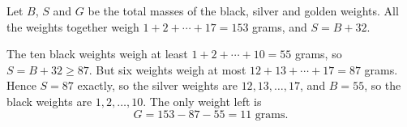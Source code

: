Let $B$, $S$ and $G$ be the total masses of the black, silver and golden weights. All the weights together weigh $1+2+\cdots+17=153$ grams, and $S=B+32$.

The ten black weights weigh at least $1+2+\cdots+10=55$ grams, so $S=B+32\ge87$. But six weights weigh at most $12+13+\cdots+17=87$ grams. Hence $S=87$ exactly, so the silver weights are $12,13,\dots,17$, and $B=55$, so the black weights are $1,2,\dots,10$. The only weight left is
\[
G=153-87-55=\boxed{11}\text{ grams}.
\]
